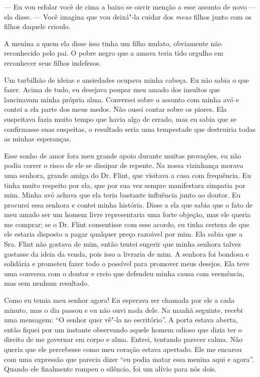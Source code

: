 --- Eu vou esfolar você de cima a baixo se ouvir menção a esse assunto
de novo --- ela disse. --- Você imagina que vou deixá"-la cuidar dos
\emph{meus} filhos junto com os filhos daquele crioulo.

A menina a quem ela disse isso tinha um filho mulato, obviamente não
reconhecido pelo pai. O pobre negro que a amava teria tido orgulho em
reconhecer seus filhos indefesos.

Um turbilhão de ideias e ansiedades
ocupava minha cabeça. Eu não sabia o que fazer. Acima de tudo, eu
desejava poupar meu amado dos insultos que lancinavam minha própria
alma. Conversei sobre o assunto com minha avó e contei a ela parte dos
meus medos. Não ousei contar sobre os piores. Ela suspeitava fazia muito
tempo que havia algo de errado, mas eu sabia que se confirmasse suas
suspeitas, o resultado seria uma tempestade que destruiria todas as
minhas esperanças.

Esse sonho de amor fora meu grande
apoio durante muitas provações, eu não podia correr o risco de ele se
dissipar de repente. Na nossa vizinhança morava uma senhora, grande
amiga do Dr. Flint, que visitava a casa com frequência. Eu tinha muito
respeito por ela, que por sua vez sempre manifestara simpatia por mim.
Minha avó achava que ela teria bastante influência junto ao doutor. Eu
procurei essa senhora e contei minha história. Disse a ela que sabia que
o fato de meu amado ser um homem livre representaria uma forte objeção,
mas ele queria me comprar; se o Dr. Flint consentisse com esse acordo,
eu tinha certeza de que ele estaria disposto a pagar qualquer preço
razoável por mim. Ela sabia que a Sra. Flint não gostava de mim, então
tentei sugerir que minha senhora talvez gostasse da ideia da venda, pois
isso a livraria de mim. A senhora foi bondosa e solidária e prometeu
fazer todo o possível para promover meus desejos. Ela teve uma conversa
com o doutor e creio que defendeu minha causa com veemência, mas sem
nenhum resultado.

Como eu temia meu senhor agora! Eu
esperava ser chamada por ele a cada minuto, mas o dia passou e eu não
ouvi nada dele. Na manhã seguinte, recebi uma mensagem: ``O senhor quer
vê"-la no escritório''. A porta estava aberta, então fiquei por um
instante observando aquele homem odioso que dizia ter o direito de me
governar em corpo e alma. Entrei, tentando parecer calma. Não queria que
ele percebesse como meu coração estava apertado. Ele me encarou com uma
expressão que parecia dizer ``eu podia matar essa menina aqui e agora''.
Quando ele finalmente rompeu o silêncio, foi um alívio para nós dois.

